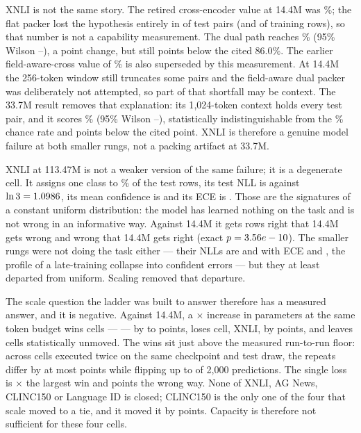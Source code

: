 XNLI is not the same story. The retired cross-encoder value at 14.4M was
\SuiteSmallXnliRaw\%; the flat packer lost the hypothesis entirely in
\SuiteXnliAbsentTest{} of \SuiteXnliTestN{} test pairs (and
\SuiteXnliAbsentTrain{} of \SuiteXnliTrainN{} training rows), so that number is
not a capability measurement. The dual path reaches \SuiteSmallXnli\% (95\%
Wilson \SuiteSmallXnliLo--\SuiteSmallXnliHi), a \SuiteSmallXnliGain{} point
change, but still \SuiteSmallXnliShortfall{} points below the cited 86.0\%. The
earlier field-aware-cross value of \SuiteSmallXnliPriorFix\% is also superseded
by this measurement. At 14.4M the 256-token window still truncates some pairs
and the field-aware dual packer was deliberately not attempted, so part of that
shortfall may be context. The 33.7M result removes that explanation: its
1{,}024-token context holds every test pair, and it scores \SuiteMidXnli\% (95\%
Wilson \SuiteMidXnliLo--\SuiteMidXnliHi), statistically indistinguishable from
the \SuiteXnliChance\% chance rate and \SuiteMidXnliShortfall{} points below the
cited point. XNLI is therefore a genuine model failure at both smaller
rungs, not a packing artifact at 33.7M.

XNLI at 113.47M is not a weaker version of the same failure; it is a degenerate
cell. It assigns one class to \SuiteLargeXnliTopShare\% of the test rows, its
test NLL is \SuiteLargeXnliNll{} against $\ln 3 = 1.0986$, its mean
confidence is \SuiteLargeXnliConf{} and its ECE is \SuiteLargeXnliEce. Those are
the signatures of a constant uniform distribution: the model has learned nothing
on the task and is not wrong in an informative way. Against 14.4M it gets
\SuiteLargeOnlyXnli{} rows right that 14.4M gets wrong and \SuiteSmallOnlyXnli{}
wrong that 14.4M gets right (exact $p = 3.56e-10$). The smaller
rungs were not doing the task either --- their NLLs are \SuiteSmallXnliNll{} and
\SuiteMidXnliNll{} with ECE \SuiteSmallXnliEce{} and \SuiteMidXnliEce, the
profile of a late-training collapse into confident errors --- but they at least
departed from uniform. Scaling removed that departure.

The scale question the ladder was built to answer therefore has a measured
answer, and it is negative. Against 14.4M, a \SuiteLargeParamsRatio$\times$
increase in parameters at the same token budget wins \SuiteLargeWins{} cells ---
\SuiteLargeWinCells{} --- by \SuiteLargeWinMin{} to \SuiteLargeWinMax{} points,
loses \SuiteLargeLosses{} cell, XNLI, by \SuiteLargeLossAbs{} points, and leaves
\SuiteLargeUnmoved{} cells statistically unmoved. The wins sit just above the
measured run-to-run floor: across \SuiteReplicationCells{} cells executed twice
on the same checkpoint and test draw, the repeats differ by at most
\SuiteReplicationMax{} points while flipping up to \SuiteReplicationFlips{} of
2{,}000 predictions. The single loss is \SuiteLargeLossOverWinMax$\times$ the
largest win and points the wrong way. None of XNLI, AG News, CLINC150 or
Language ID is closed; CLINC150 is the only one of the four that scale moved to
a tie, and it moved it by \SuiteLargeVsSmallClinc{} points. Capacity is therefore not
sufficient for these four cells.

